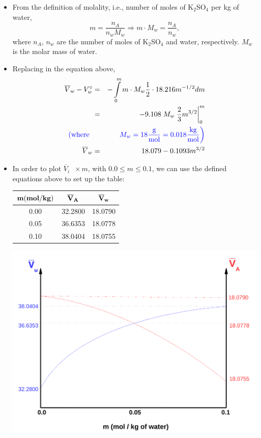\documentclass[12pts,a4paper,amsmath,amssymb,floatfix]{article}%
\newcommand{\frc}{\displaystyle\frac}
\newcommand{\blue}{\textcolor{blue}}
\begin{document}
\begin{enumerate}[1)]
\begin{itemize}
  \item From the definition of molality, i.e., number of moles of K$_{2}$SO$_{4}$ per kg of water,
       \begin{displaymath}
           m = \frc{n_{A}}{n_{w}M_{w}} \Longrightarrow m\cdot M_{w} = \frc{n_{A}}{n_{w}},
       \end{displaymath}
       where $n_{A}$, $n_{w}$ are the number of moles of K$_{2}$SO$_{4}$ and water, respectively. $M_{w}$ is the molar mass of water.

  \item Replacing in the equation above, 
      \begin{eqnarray}
         \overline{V}_{w} - V_{w}^{\circ} &=& -\int\limits_{0}^{m} m\cdot M_{w} \frc{1}{2}\cdot 18.216 m^{-1/2} dm \nonumber \\
                                       &=& -9.108\; M_{w} \left. \frc{2}{3} m^{3/2}\right|_{0}^{m} \nonumber \\
         \blue{\left(\text{where }\right.}&& \blue{\left. M_{w} = 18 \frc{\text{g}}{\text{mol}} = 0.018 \frc{\text{kg}}{\text{mol}}\right)} \nonumber \\
         \overline{V}_{w} &=&  18.079 - 0.1093 m^{3/2} \nonumber 
      \end{eqnarray}

  \item In order to plot $\overline{V}_{i}\;\;\times m$, with $0.0\leq m\leq 0.1$, we can use the defined equations above to set  up the table:  
        \begin{center}
          \begin{tabular}{|c | c c |}
            \hline
            ${\bf m (mol/kg)}$ & ${\bf \overline{V}_{A}}$ & ${\bf \overline{V}_{w}}$ \\
            \hline
              0.00  & 32.2800 &  18.0790 \\
              0.05  & 36.6353 &  18.0778 \\
              0.10  & 38.0404 &  18.0755 \\
             \hline
          \end{tabular}
        \end{center}
          \begin{center}
              \includegraphics[width=0.75\columnwidth,clip]{./../Pics/Example04_Pic}
          \end{center}
\end{itemize}



\end{enumerate}
\end{document}
